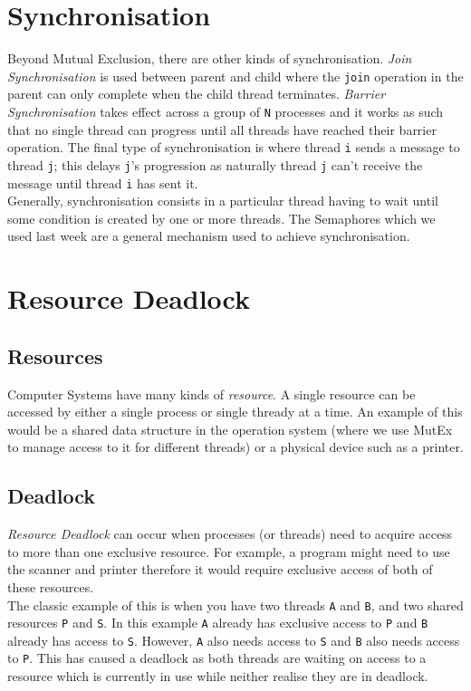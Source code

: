 
\section{Synchronisation}
Beyond Mutual Exclusion, there are other kinds of synchronisation. \textit{Join Synchronisation} is used between parent and child where the \verb|join| operation in the parent can only complete when the child thread terminates. \textit{Barrier Synchronisation} takes effect across a group of \verb|N| processes and it works as such that no single thread can progress until all threads have reached their barrier operation. The final type of synchronisation is where thread \verb|i| sends a message to thread \verb|j|; this delays \verb|j|'s progression as naturally thread \verb|j| can't receive the message until thread \verb|i| has sent it.\\

Generally, synchronisation consists in a particular thread having to wait until some condition is created by one or more threads. The Semaphores which we used last week are a general mechanism used to achieve synchronisation.

\section{Resource Deadlock}
\subsection{Resources}
Computer Systems have many kinds of \textit{resource}. A single resource can be accessed by either a single process or single thready at a time. An example of this would be a shared data structure in the operation system (where we use MutEx to manage access to it for different threads) or a physical device such as a printer. 

\subsection{Deadlock}
\textit{Resource Deadlock} can occur when processes (or threads) need to acquire access to more than one exclusive resource. For example, a program might need to use the scanner and printer therefore it would require exclusive access of both of these resources.\\

The classic example of this is when you have two threads \verb|A| and \verb|B|, and two shared resources \verb|P| and \verb|S|. In this example \verb|A| already has exclusive access to \verb|P| and \verb|B| already has access to \verb|S|. However, \verb|A| also needs access to \verb|S| and \verb|B| also needs access to \verb|P|. This has caused a deadlock as both threads are waiting on access to a resource which is currently in use while neither realise they are in deadlock. 

